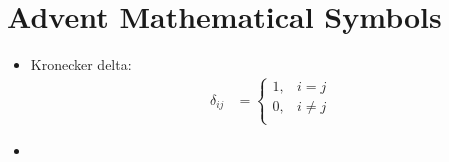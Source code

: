 \documentclass[../../note.tex]{subfiles}
\begin{document}
\chapter{Advent Mathematical Symbols}
\begin{itemize}
    \item Kronecker delta:
    \begin{align}
        \delta_{ij} 
        &= 
        \left\{ 
            \begin{array}{lc}
                1, & i=j      \\
                0, & i \neq j \\
            \end{array}
        \right.
    \end{align}
    \item 
\end{itemize}
\end{document}
